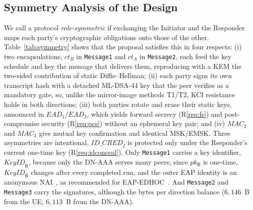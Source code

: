\documentclass[symmetry,article,submit,moreauthors]{Definitions/mdpi}
\begin{document}
\subsection{Symmetry Analysis of the Design}
\label{sec:symmetry}
We call a protocol \emph{role-symmetric} if exchanging the Initiator and the Responder maps each party's cryptographic obligations onto those of the other. Table~\ref{tab:symmetry} shows that the proposal satisfies this in four respects: (i) two encapsulations, $ct_B$ in \texttt{Message1} and $ct_A$ in \texttt{Message2}, each feed the key schedule and key the message that delivers them, reproducing with a KEM the two-sided contribution of static Diffie--Hellman; (ii) each party signs its own transcript hash with a detached ML-DSA-44 key that the peer verifies as a mandatory gate, so, unlike the mirror-image methods T1/T2, KCI resistance holds in both directions; (iii) both parties rotate and erase their static keys, announced in $\mathit{EAD}_1$/$\mathit{EAD}_2$, which yields forward secrecy (R\ref{req:fs}) and post-compromise security (R\ref{req:pcs}) without an ephemeral key pair; and (iv) $\mathit{MAC}_2$ and $\mathit{MAC}_3$ give mutual key confirmation and identical MSK/EMSK. Three asymmetries are intentional. $\mathit{ID\_CRED}_I$ is protected only under the Responder's current one-time key (R\ref{req:idconceal}). Only \texttt{Message1} carries a key identifier, $\mathit{KeyID}_{\mathsf{B}}$, because only the DN-AAA serves many peers; since $pk_{\mathsf{B}}$ is one-time, $\mathit{KeyID}_{\mathsf{B}}$ changes after every completed run, and the outer EAP identity is an anonymous NAI~\cite{RFC7542}, as recommended for EAP-EDHOC~\cite{EAPEDHOC}. And \texttt{Message2} and \texttt{Message3} carry the signatures, although the bytes per direction balance ($6{,}146$~B from the UE, $6{,}113$~B from the DN-AAA).
\end{document}
